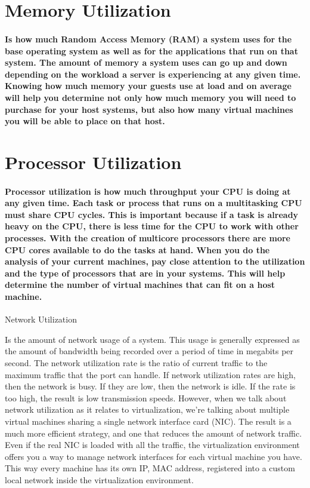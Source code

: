 \documentclass[a4paper,12pt]{report}
\begin{document}
\section{Memory Utilization}

\paragraph{Is how much Random Access Memory (RAM) a system uses for the base
operating system as well as for the applications that run on that system. The amount of memory a system uses can go up and down depending on the workload a server is experiencing
at any given time. Knowing how much memory your guests use at load and on average will
help you determine not only how much memory you will need to purchase for your host
systems, but also how many virtual machines you will be able to place on that host.
}

\section{Processor Utilization}

\paragraph{Processor utilization is how much throughput your CPU is doing at any given time. Each
task or process that runs on a multitasking CPU must share CPU cycles. This is important because if a task is already heavy on the CPU, there is less time for the CPU to work
with other processes. With the creation of multicore processors there are more CPU cores
available to do the tasks at hand. When you do the analysis of your current machines, pay
close attention to the utilization and the type of processors that are in your systems. This
will help determine the number of virtual machines that can fit on a host machine.
}

Network Utilization

Is the amount of network usage of a system. This usage is generally expressed as the amount of bandwidth being recorded over a period of time in megabits per second. The network utilization rate is the ratio of current traffic to the maximum traffic that the
port can handle. If network utilization rates are high, then the network is busy. If they are
low, then the network is idle. If the rate is too high, the result is low transmission speeds.
However, when we talk about network utilization as it relates to virtualization, 
we’re talking about multiple virtual machines sharing a single network interface card 
(NIC). The result is a much more efficient strategy, and one that reduces the amount of network traffic. 
Even if the real NIC is loaded with all the traffic, the virtualization environment offers you a way to manage network interfaces for each virtual machine you have. This way every machine has its own IP, MAC address, registered into a custom local network inside the virtualization environment. 
\end{document}
